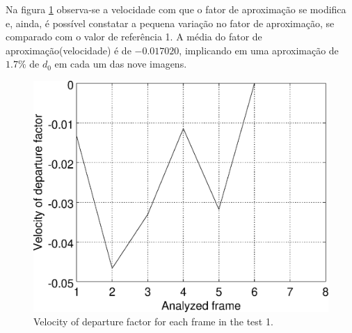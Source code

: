 Na figura \ref{fig:res_graph1v} observa-se a velocidade com que o fator de aproximação se modifica e, ainda,
é possível constatar a pequena variação no fator de aproximação, se comparado
com o valor de referência 1. A média do fator de aproximação(velocidade) é de $-0.017020$, implicando
em uma aproximação de $1.7\%$ de $d_0$ em cada um das nove imagens.

\begin{figure}[!hbt]
\centering
\includegraphics[width=0.8\columnwidth]{images/graph1v.eps}
\caption{Velocity of departure factor for each frame in the test 1.}
\label{fig:res_graph1v}
\end{figure}
